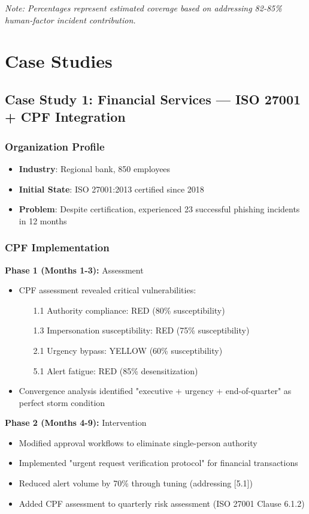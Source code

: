 \documentclass[11pt,a4paper]{article}
\begin{document}
\textit{Note: Percentages represent estimated coverage based on addressing 82-85\% human-factor incident contribution.}

\section{Case Studies}

\subsection{Case Study 1: Financial Services --- ISO 27001 + CPF Integration}

\subsubsection{Organization Profile}
\begin{itemize}
\item \textbf{Industry}: Regional bank, 850 employees
\item \textbf{Initial State}: ISO 27001:2013 certified since 2018
\item \textbf{Problem}: Despite certification, experienced 23 successful phishing incidents in 12 months
\end{itemize}

\subsubsection{CPF Implementation}

\textbf{Phase 1 (Months 1-3):} Assessment
\begin{itemize}
\item CPF assessment revealed critical vulnerabilities:
  \begin{itemize}
  \item [1.1] Authority compliance: RED (80\% susceptibility)
  \item [1.3] Impersonation susceptibility: RED (75\% susceptibility)
  \item [2.1] Urgency bypass: YELLOW (60\% susceptibility)
  \item [5.1] Alert fatigue: RED (85\% desensitization)
  \end{itemize}
\item Convergence analysis identified "executive + urgency + end-of-quarter" as perfect storm condition
\end{itemize}

\textbf{Phase 2 (Months 4-9):} Intervention
\begin{itemize}
\item Modified approval workflows to eliminate single-person authority
\item Implemented "urgent request verification protocol" for financial transactions
\item Reduced alert volume by 70\% through tuning (addressing [5.1])
\item Added CPF assessment to quarterly risk assessment (ISO 27001 Clause 6.1.2)
\end{itemize}
\end{document}
